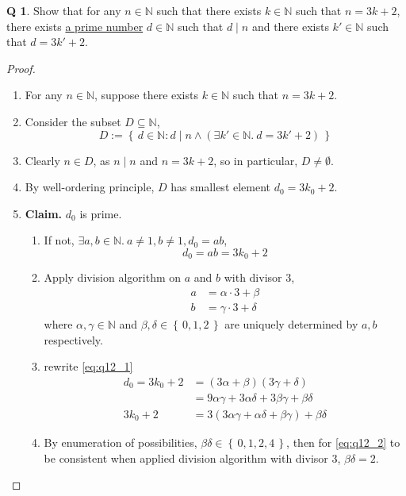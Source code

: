 \documentclass[12pt]{article}
\newcommand{\set}[1]{\left\{\,#1\,\right\}}
\theoremstyle{definition}
\newtheorem{qn}{Q}
\numberwithin{equation}{qn}
\newcommand{\nat}{\mathbb{N}}
\newenvironment{prf}
{
    \begin{proof}
        \hfill
        \begin{enumerate}[label*=\arabic*.]
                }
                {
                \hfill\qedsymbol
        \end{enumerate}
    \renewcommand{\qedsymbol}{}
    \end{proof}
}
\begin{document}
\newpage
\begin{qn}
    Show that for any $n\in\nat$ such that there exists $k\in\nat$ such that $n=3k+2$,
    there exists \underline{a prime number} $d\in\nat$ such that $d\mid n$ and there exists $k'\in\nat$ such that $d=3k'+2$.
\end{qn}
\begin{prf}
\item For any $n\in\nat$, suppose there exists $k\in\nat$ such that $n=3k+2$.
\item Consider the subset $D\subseteq \nat$,
    $$D :=\set{d\in\nat: d\mid n \land (\exists k'\in\nat.~ d=3k'+2)}$$
\item Clearly $n\in D$, as $n\mid n$ and $n = 3k + 2$, so in particular, $D\ne\emptyset$.
\item By well-ordering principle, $D$ has smallest element $d_0 = 3k_0 + 2$.
\item[] \textbf{Claim.} $d_0$ is prime.
    \begin{enumerate}[label=(\arabic*).]
        \item If not, $\exists a,b\in\nat.~ a\ne1, b\ne1, d_0 = ab$,
            \begin{equation}    \label{eq:q12_1}
                d_0 = ab = 3k_0 + 2
            \end{equation}
        \item Apply division algorithm on $a$ and $b$ with divisor $3$,
            \begin{align*}
                a &= \alpha\cdot 3 + \beta  \\
                b &= \gamma\cdot 3 + \delta
            \end{align*}
            where $\alpha,\gamma\in\nat$ and $\beta,\delta\in\set{0,1,2}$ are
            uniquely determined by $a,b$ respectively.
        \item rewrite \eqref{eq:q12_1}
            \begin{align}
                d_0 = 3k_0 + 2 &= (3\alpha + \beta)(3\gamma + \delta)    \\
                &= 9\alpha\gamma + 3\alpha\delta + 3\beta\gamma + \beta\delta \\
                \label{eq:q12_2}
                3k_0 + 2 &= 3(3\alpha\gamma + \alpha\delta + \beta\gamma) + \beta\delta
            \end{align}
        \item By enumeration of possibilities, $\beta\delta \in \set{0,1,2,4}$, then for \eqref{eq:q12_2} to be consistent when applied division algorithm with divisor $3$, $\beta\delta = 2$.

\end{enumerate}
\end{prf}
\end{document}
